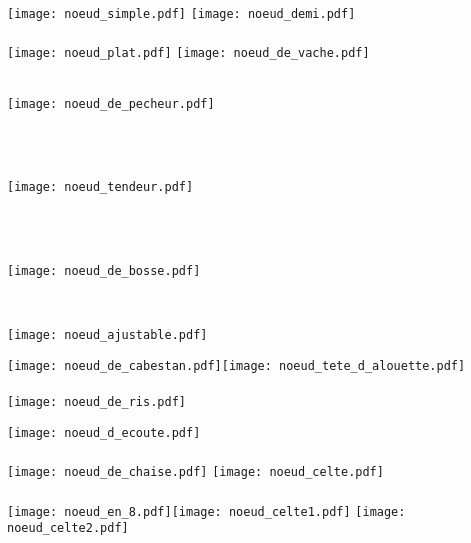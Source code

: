 \documentclass{livret}
\begin{document}
\texttt{[image: noeud\_simple.pdf]} \hfill \texttt{[image: noeud\_demi.pdf]}\\
\\
\texttt{[image: noeud\_plat.pdf]} \hfill \texttt{[image: noeud\_de\_vache.pdf]}\\
\\
\centerline{\texttt{[image: noeud\_de\_pecheur.pdf]}}\\
\\
\centerline{\texttt{[image: noeud\_tendeur.pdf]}}\\
\\
\centerline{\texttt{[image: noeud\_de\_bosse.pdf]}}\\
\centerline{\texttt{[image: noeud\_ajustable.pdf]}}

\newpage

\begin{minipage}[b]{7cm}
 \texttt{[image: noeud\_de\_cabestan.pdf]}\texttt{[image: noeud\_tete\_d\_alouette.pdf]}\\\\
 \texttt{[image: noeud\_de\_ris.pdf]}
\end{minipage} \hfill \texttt{[image: noeud\_d\_ecoute.pdf]}\\
\\
\texttt{[image: noeud\_de\_chaise.pdf]} \hfill \texttt{[image: noeud\_celte.pdf]}\\
\\
\texttt{[image: noeud\_en\_8.pdf]}\texttt{[image: noeud\_celte1.pdf]} \hfill \texttt{[image: noeud\_celte2.pdf]}
\end{document}
